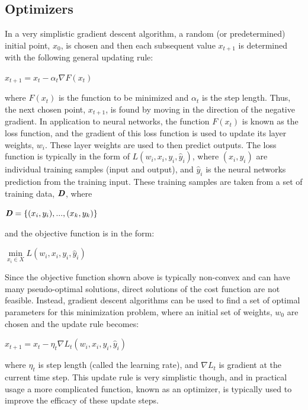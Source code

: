 \subsection{Optimizers}

In a very simplistic gradient descent algorithm, a random (or predetermined) initial point, $x_0$, is chosen and then each subsequent value $x_{t+1}$ is determined with the following general updating rule:
\begin{center}
$x_{t+1} = x_t - \alpha_t \nabla F(x_t) $
\end{center}
where $F(x_t)$ is the function to be minimized and $\alpha_t$ is the step length. Thus, the next chosen point, $x_{t+1}$, is found by moving in the direction of the negative gradient. In application to neural networks, the function $F(x_t)$ is known as the loss function, and the gradient of this loss function is used to update its layer weights, $w_i$. These layer weights are used to then predict outputs. The loss function is typically in the form of $L(w_i,x_i,y_i,\hat y_i)$, where $(x_i,y_i)$ are individual training samples (input and output), and $\hat y_i$ is the neural networks prediction from the training input. These training samples are taken from a set of training data, $\textbf{\textit{D}}$, where
\begin{center}
$\textbf{\textit{D}} = \{(x_i,y_i),...,(x_k,y_k)\}$
\end{center}
and the objective function is in the form:
\begin{center}
$\min\limits_{x_i \in X} L(w_i,x_i,y_i,\hat y_i)$
\end{center}
Since the objective function shown above is typically non-convex and can have many pseudo-optimal solutions, direct solutions of the cost function are not feasible. Instead, gradient descent algorithms can be used to find a set of optimal parameters for this minimization problem, where an initial set of weights, $w_0$ are chosen and the update rule becomes:
\begin{center}
$x_{t+1} = x_t - \eta_t \nabla L_t(w_i,x_i,y_i,\hat y_i)$
\end{center}
where $\eta_t$ is step length (called the learning rate), and $\nabla L_t$ is gradient at the current time step. This update rule is very simplistic though, and in practical usage a more complicated function, known as an optimizer, is typically used to improve the efficacy of these update steps.


